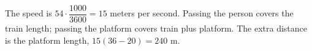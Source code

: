 The speed is $54\cdot\dfrac{1000}{3600}=15$ meters per second. Passing the person covers the train length; passing the platform covers train plus platform. The extra distance is the platform length, $15(36-20)=\boxed{240\text{ m}}$.
